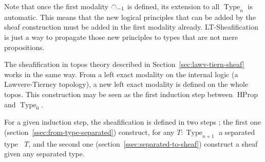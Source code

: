 \documentclass[preprint,9pt,numbers]{sigplanconf}
\newcommand{\mynote}[2]{
    \fbox{\bfseries\sffamily\scriptsize#1}
    {\small$\blacktriangleright$\textsf{\emph{#2}}$\blacktriangleleft$}~}
\newcommand\kq[1]{\mynote{KQ}{#1}}
\DeclareMathOperator{\Type}{Type}
\DeclareMathOperator{\HProp}{HProp}
\newcommand{\modal}{\ensuremath{\ocircle}}
\newcommand \separated {\mathop{\square_{n+1}} }
\newenvironment{mymath}[1][-0em]{%
  \newcommand\mymathaux{\vspace{#1}}%
  \vspace{#1}%
  \begin{equation*}%
  }{ %
    \mymathaux%
  \end{equation*}}
\begin{document}
\label{sec:sheaf-left-exact}Note that once the first modality $\modal_{-1}$ is defined, its
extension to all $\Type_n$ is automatic. This means that the new
logical principles that can be added by the sheaf construction must be
added in the first modality already. LT-Sheafification is just a way
to propagate those new principles to types that are not mere
propositions.





The sheafification in topos theory described in
Section~\ref{sec:lawv-tiern-sheaf} works in the same way. 
%
From a left exact modality on the internal logic (a Lawvere-Tierney
topology), a new left exact modality is defined on the whole topos.
%
This construction may be seen as the first induction step between
$\HProp$ and $\Type_0$. 


For a given induction step, the sheafification is defined in two
steps ; the first one (section~\ref{ssec:from-type-separated}) construct, for any $T:\Type_{n+1}$ a separated
type $\separated T$, and the second one
(section~\ref{ssec:separated-to-sheaf}) construct a sheaf given any
separated type.


\end{document}
